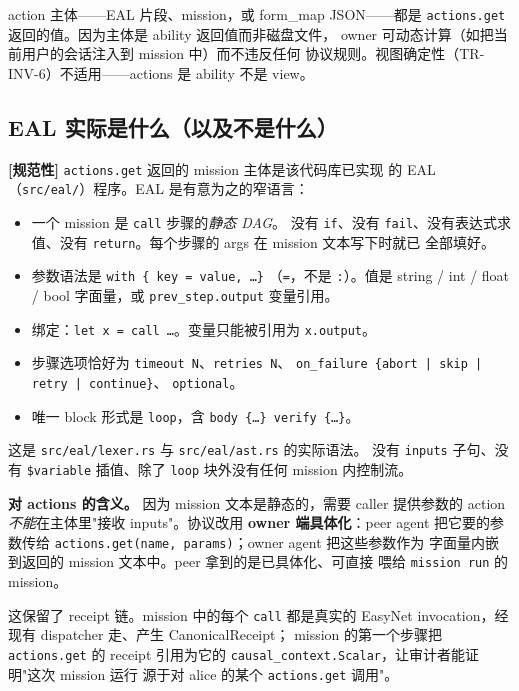 \documentclass[11pt,a4paper]{article}
\newcommand{\normsv}{\textcolor{normativecolor}{\textbf{[规范性]}}\xspace}
\theoremstyle{definition}
\begin{document}
action 主体——EAL 片段、mission，或 form\_map JSON——都是
\texttt{actions.get} 返回的值。因为主体是 ability 返回值而非磁盘文件，
owner 可动态计算（如把当前用户的会话注入到 mission 中）而不违反任何
协议规则。视图确定性（TR-INV-6）不适用——actions 是 ability 不是
view。

\subsection{EAL 实际是什么（以及不是什么）}
\label{sec:eal-grammar-note-cn}

\normsv{} \texttt{actions.get} 返回的 mission 主体是该代码库已实现
的 EAL（\texttt{src/eal/}）程序。EAL 是有意为之的窄语言：

\begin{itemize}[leftmargin=2em,itemsep=0.15em]
    \item 一个 mission 是 \texttt{call} 步骤的\emph{静态 DAG}。
    没有 \texttt{if}、没有 \texttt{fail}、没有表达式求值、没有
    \texttt{return}。每个步骤的 args 在 mission 文本写下时就已
    全部填好。
    \item 参数语法是 \texttt{with \{ key = value, \ldots \}}
    （\texttt{=}，不是 \texttt{:}）。值是 string / int / float /
    bool 字面量，或 \texttt{prev\_step.output} 变量引用。
    \item 绑定：\texttt{let x = call \ldots}。变量只能被引用为
    \texttt{x.output}。
    \item 步骤选项恰好为 \texttt{timeout N}、\texttt{retries N}、
    \texttt{on\_failure \{abort | skip | retry | continue\}}、
    \texttt{optional}。
    \item 唯一 block 形式是 \texttt{loop}，含
    \texttt{body \{\ldots\} verify \{\ldots\}}。
\end{itemize}

这是 \texttt{src/eal/lexer.rs} 与 \texttt{src/eal/ast.rs} 的实际语法。
没有 \texttt{inputs} 子句、没有 \texttt{\$variable} 插值、除了
\texttt{loop} 块外没有任何 mission 内控制流。

\textbf{对 actions 的含义。} 因为 mission 文本是静态的，需要 caller
提供参数的 action \emph{不能}在主体里"接收 inputs"。协议改用
\textbf{owner 端具体化}：peer agent 把它要的参数传给
\texttt{actions.get(name, params)}；owner agent 把这些参数作为
字面量内嵌到返回的 mission 文本中。peer 拿到的是已具体化、可直接
喂给 \texttt{mission run} 的 mission。

这保留了 receipt 链。mission 中的每个 \texttt{call} 都是真实的
EasyNet invocation，经现有 dispatcher 走、产生 CanonicalReceipt；
mission 的第一个步骤把 \texttt{actions.get} 的 receipt 引用为它的
\texttt{causal\_context.Scalar}，让审计者能证明"这次 mission 运行
源于对 alice 的某个 \texttt{actions.get} 调用"。
\end{document}
